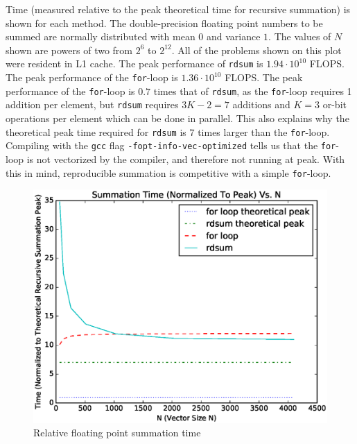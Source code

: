   Time (measured relative to the peak theoretical time for recursive summation) is shown for each method. The double-precision floating point numbers to be summed are normally distributed with mean $0$ and variance $1$. The values of $N$ shown are powers of two from $2^6$ to $2^{12}$. All of the problems shown on this plot were resident in L1 cache. The peak performance of \texttt{rdsum} is $1.94\cdot 10^{10}$ FLOPS. The peak performance of the \texttt{for}-loop is $1.36\cdot 10^{10}$ FLOPS. The peak performance of the \texttt{for}-loop is $0.7$ times that of \texttt{rdsum}, as the \texttt{for}-loop requires 1 addition per element, but \texttt{rdsum} requires $3K - 2 = 7$ additions and $K = 3$ or-bit operations per element which can be done in parallel. This also explains why the theoretical peak time required for \texttt{rdsum} is 7 times larger than the \texttt{for}-loop. Compiling with the \texttt{gcc} flag \texttt{-fopt-info-vec-optimized} tells us that the \texttt{for}-loop is not vectorized by the compiler, and therefore not running at peak. With this in mind, reproducible summation is competitive with a simple \texttt{for}-loop.
  \begin{figure}[H]
  \begin{center}
  \includegraphics[width=\textwidth]{plots/sum_comparison}
  \caption{Relative floating point summation time}
  \label{fig:forloop_timings}
  \end{center}
  \end{figure}
